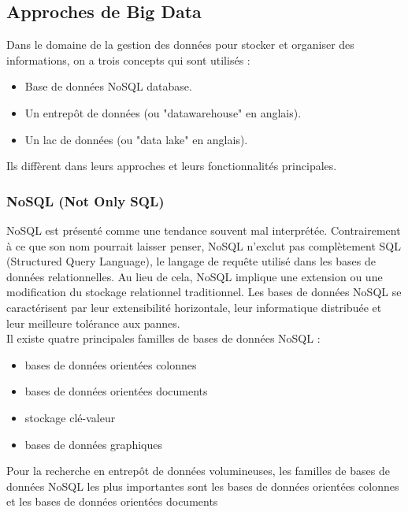 \documentclass{report}
\begin{document}
\subsection{Approches de Big Data}
Dans le domaine de la gestion des données pour stocker et organiser des informations, on a trois concepts qui sont utilisés : \\
\begin{itemize}
\item Base de données NoSQL database.
\item Un entrepôt de données (ou "datawarehouse" en anglais).
\item Un lac de données (ou "data lake" en anglais). \\
\end{itemize} 
Ils diffèrent dans leurs approches et leurs fonctionnalités principales.

\subsubsection{NoSQL (Not Only SQL)}
NoSQL est présenté comme une tendance souvent mal interprétée. Contrairement à ce que son nom pourrait laisser penser, NoSQL n'exclut pas complètement SQL (Structured Query Language), le langage de requête utilisé dans les bases de données relationnelles. Au lieu de cela, NoSQL implique une extension ou une modification du stockage relationnel traditionnel. Les bases de données NoSQL se caractérisent par leur extensibilité horizontale, leur informatique distribuée et leur meilleure tolérance aux pannes. \\

Il existe quatre principales familles de bases de données NoSQL : 
\begin{itemize}
\item bases de données orientées colonnes
\item bases de données orientées documents
\item stockage clé-valeur
\item bases de données graphiques
\end{itemize}
Pour la recherche en entrepôt de données volumineuses, les familles de bases de données NoSQL les plus importantes sont les bases de données orientées colonnes et les bases de données orientées documents
\cite{Marina Ptiček and Boris Vrdoljak ,2017}
\end{document}
